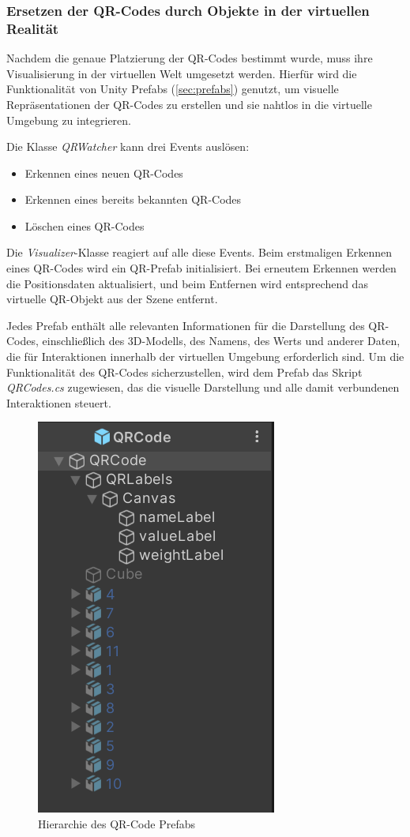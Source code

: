 \subsubsection{\label{sec:qrvisualizer}Ersetzen der QR-Codes durch Objekte in der virtuellen Realität}
Nachdem die genaue Platzierung der QR-Codes bestimmt wurde, muss ihre Visualisierung in der virtuellen Welt umgesetzt werden. Hierfür wird die Funktionalität von Unity Prefabs (\ref{sec:prefabs}) genutzt, um visuelle Repräsentationen der QR-Codes zu erstellen und sie nahtlos in die virtuelle Umgebung zu integrieren.

Die Klasse \textit{QRWatcher} kann drei Events auslösen:
\begin{itemize}
\item Erkennen eines neuen QR-Codes
\item Erkennen eines bereits bekannten QR-Codes
\item Löschen eines QR-Codes
\end{itemize}

Die \textit{Visualizer}-Klasse reagiert auf alle diese Events. Beim erstmaligen Erkennen eines QR-Codes wird ein QR-Prefab initialisiert. Bei erneutem Erkennen werden die Positionsdaten aktualisiert, und beim Entfernen wird entsprechend das virtuelle QR-Objekt aus der Szene entfernt.

Jedes Prefab enthält alle relevanten Informationen für die Darstellung des QR-Codes, einschließlich des 3D-Modells, des Namens, des Werts und anderer Daten, die für Interaktionen innerhalb der virtuellen Umgebung erforderlich sind. Um die Funktionalität des QR-Codes sicherzustellen, wird dem Prefab das Skript \textit{QRCodes.cs} zugewiesen, das die visuelle Darstellung und alle damit verbundenen Interaktionen steuert.

\begin{figure}[H]
\centering
\includegraphics[scale=0.6, angle=0]{images/qrprefab}
\caption{Hierarchie des QR-Code Prefabs}
\label{fig:qrprefab}
\end{figure}


